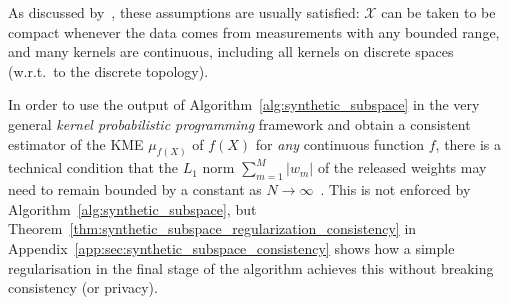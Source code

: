 \documentclass{article}
\newcommand{\calX}{\mathcal{X}}			%
\theoremstyle{plain}
\theoremstyle{remark}
\theoremstyle{definition}
\begin{document}
As discussed by~\citet{scibior_consistent_2016}, these assumptions are usually satisfied: $\calX$ can be taken to be compact whenever the data comes from measurements with any bounded range, and many kernels are continuous, including all kernels on discrete spaces (w.r.t.~to the discrete topology).

In order to use the output of Algorithm~\ref{alg:synthetic_subspace} in the very general \emph{kernel probabilistic programming} framework and obtain a consistent estimator of the KME $\mu_{f(X)}$ of $f(X)$ for \emph{any} continuous function $f$, there is a technical condition that the $L_1$ norm $\sum_{m = 1}^M |w_m|$ of the released weights may need to remain bounded by a constant as $N \to \infty$~\cite{scibior_consistent_2016}. This is not enforced by Algorithm~\ref{alg:synthetic_subspace}, but Theorem~\ref{thm:synthetic_subspace_regularization_consistency} in Appendix~\ref{app:sec:synthetic_subspace_consistency} shows how a simple regularisation in the final stage of the algorithm achieves this without breaking consistency (or privacy).
\end{document}
